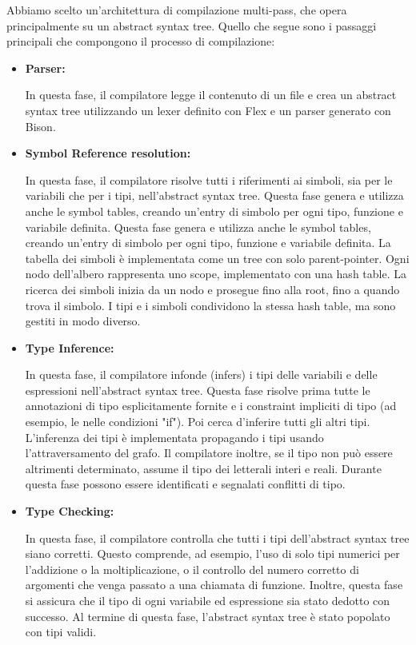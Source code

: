 \documentclass[a4paper]{article}
\begin{document}
Abbiamo scelto un'architettura di compilazione multi-pass, che opera principalmente su un abstract syntax tree.
Quello che segue sono i passaggi principali che compongono il processo di compilazione:

\begin{itemize}
    \item \textbf{Parser:}

    In questa fase, il compilatore legge il contenuto di un file e crea un abstract syntax tree utilizzando un lexer definito con Flex e un parser generato con Bison.

    \item \textbf{Symbol Reference resolution:}

    In questa fase, il compilatore risolve tutti i riferimenti ai simboli, sia per le variabili che
    per i tipi, nell'abstract syntax tree. Questa fase genera e utilizza anche le symbol tables,
    creando un'entry di simbolo per ogni tipo, funzione e variabile definita. Questa fase genera e
    utilizza anche le symbol tables, creando un'entry di simbolo per ogni tipo, funzione e variabile
    definita. La tabella dei simboli è implementata come un tree con solo parent-pointer. Ogni nodo
    dell'albero rappresenta uno scope, implementato con una hash table. La ricerca dei simboli inizia
    da un nodo e prosegue fino alla root, fino a quando trova il simbolo. I tipi e i simboli
    condividono la stessa hash table, ma sono gestiti in modo diverso.

    \item \textbf{Type Inference:}

    In questa fase, il compilatore infonde (infers) i tipi delle variabili e delle
    espressioni nell'abstract syntax tree. Questa
    fase risolve prima tutte le annotazioni di tipo esplicitamente fornite e i
    constraint impliciti di tipo (ad esempio, le nelle condizioni "if").
    Poi cerca d'inferire tutti gli altri tipi. L'inferenza dei tipi è
    implementata propagando i tipi usando l'attraversamento del grafo. Il
    compilatore inoltre, se il tipo non può essere altrimenti determinato,
    assume il tipo dei letterali interi e reali. Durante questa fase possono
    essere identificati e segnalati conflitti di tipo.

    \item \textbf{Type Checking:}

    In questa fase, il compilatore controlla che tutti i tipi dell'abstract syntax tree siano
    corretti. Questo comprende, ad esempio, l'uso di solo tipi numerici per l'addizione o la
    moltiplicazione, o il controllo del numero corretto di argomenti che venga passato a una
    chiamata di funzione. Inoltre, questa fase si assicura che il tipo di ogni variabile ed
    espressione sia stato dedotto con successo. Al termine di questa fase, l'abstract syntax tree
    è stato popolato con tipi validi.


\end{itemize}
\end{document}
